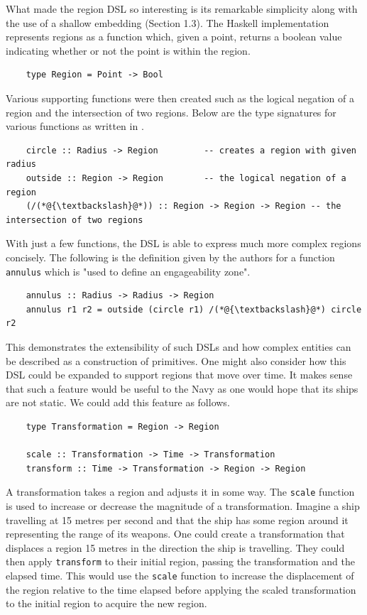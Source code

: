 \documentclass[11pt]{article}
\begin{document}
\medbreak

What made the region DSL so interesting is its remarkable simplicity along with the use of
a shallow embedding (Section 1.3). The Haskell implementation represents regions as
a function which, given a point, returns a boolean value indicating whether or not
the point is within the region.

\begin{lstlisting}
    type Region = Point -> Bool
\end{lstlisting}

Various supporting functions were then created such as the logical negation of a
region and the intersection of two regions. Below are the type signatures for
various functions as written in \cite{regions}.

\begin{lstlisting}
    circle :: Radius -> Region         -- creates a region with given radius
    outside :: Region -> Region        -- the logical negation of a region
    (/(*@{\textbackslash}@*)) :: Region -> Region -> Region -- the intersection of two regions
\end{lstlisting}

With just a few functions, the DSL is able to express much more complex regions
concisely. The following is the definition given by the authors for a function
\texttt{annulus} which is "used to define an engageability zone".

\begin{lstlisting}
    annulus :: Radius -> Radius -> Region
    annulus r1 r2 = outside (circle r1) /(*@{\textbackslash}@*) circle r2
\end{lstlisting}

This demonstrates the extensibility of such DSLs and how complex entities
can be described as a construction of primitives. One might also consider
how this DSL could be expanded to support regions that move over time.
It makes sense that such a feature would be useful to the Navy as one
would hope that its ships are not static. We could add this feature
as follows.

\begin{lstlisting}
    type Transformation = Region -> Region

    scale :: Transformation -> Time -> Transformation
    transform :: Time -> Transformation -> Region -> Region
\end{lstlisting}

A transformation takes a region and adjusts it in some way. The \texttt{scale}
function is used to increase or decrease the magnitude of a transformation.
Imagine a ship travelling at 15 metres per second and that the ship has some
region around it representing the range of its weapons. One could create a transformation
that displaces a region 15 metres in the direction the ship is travelling. They could then apply
\texttt{transform} to their initial region, passing the transformation
and the elapsed time. This would use the \texttt{scale} function to increase the
displacement of the region relative to the time elapsed before applying the
scaled transformation to the initial region to acquire the new region.
\end{document}
